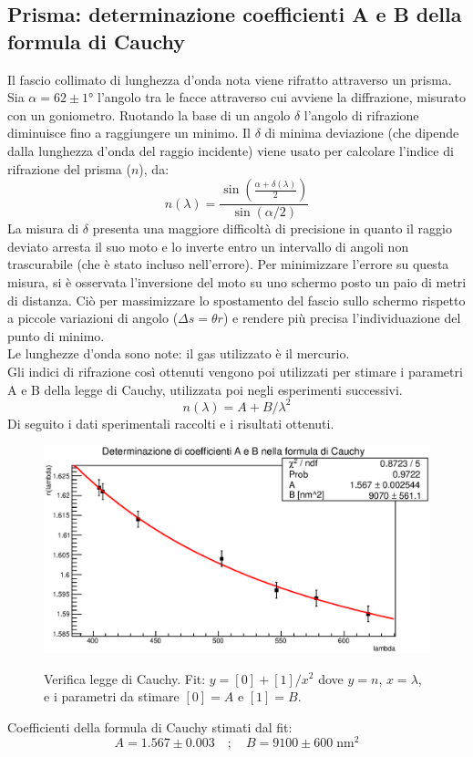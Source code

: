 \clearpage
\subsection{Prisma: determinazione coefficienti A e B della formula di Cauchy}
\label{sec:prisma1}
Il fascio collimato di lunghezza d'onda nota viene rifratto attraverso un prisma. Sia $\alpha = 62 \pm 1 °$ l'angolo tra le facce attraverso cui avviene la diffrazione, misurato con un goniometro. Ruotando la base di un angolo $\delta$ l'angolo di rifrazione diminuisce fino a raggiungere un minimo. Il $\delta$ di minima deviazione (che dipende dalla lunghezza d'onda del raggio incidente) viene usato per calcolare l'indice di rifrazione del prisma ($n$), da:
    $$ n(\lambda) = \frac{\sin(\frac{\alpha + \delta(\lambda)}{2})}{\sin(\alpha/2) } $$
La misura di $\delta$ presenta una maggiore difficoltà di precisione in quanto il raggio deviato arresta il suo moto e lo inverte entro un intervallo di angoli non trascurabile (che è stato incluso nell'errore). Per minimizzare l'errore su questa misura, si è osservata l'inversione del moto su uno schermo posto un paio di metri di distanza. Ciò per massimizzare lo spostamento del fascio sullo schermo rispetto a piccole variazioni di angolo ($\Delta s = \theta r$) e rendere più precisa l'individuazione del punto di minimo.\\
%
Le lunghezze d'onda sono note: il gas utilizzato è il mercurio.\\
Gli indici di rifrazione così ottenuti vengono poi utilizzati per stimare i parametri A e B della legge di Cauchy, utilizzata poi negli esperimenti successivi.
    $$ n(\lambda) = A + B/\lambda^2 $$
Di seguito i dati sperimentali raccolti e i risultati ottenuti.\\
%

%
%
    \begin{figure}[H]
    \centering
    \includegraphics[scale=0.8]{Grafici/O3_P2_1_AB.eps}
    \label{fig:C3_P2_RL}
    \caption{Verifica legge di Cauchy. Fit: $y = [0] + [1]/x^{2}$ dove $y = n$, $x = \lambda$, e i parametri da stimare $[0] = A$ e $[1] = B$. }
    \end{figure} 
%
%
%
%
Coefficienti della formula di Cauchy stimati dal fit:
$$ A = 1.567 \pm 0.003 \quad ;\quad B = 9100 \pm 600 \;\mathrm{ nm^{2}} $$
%
